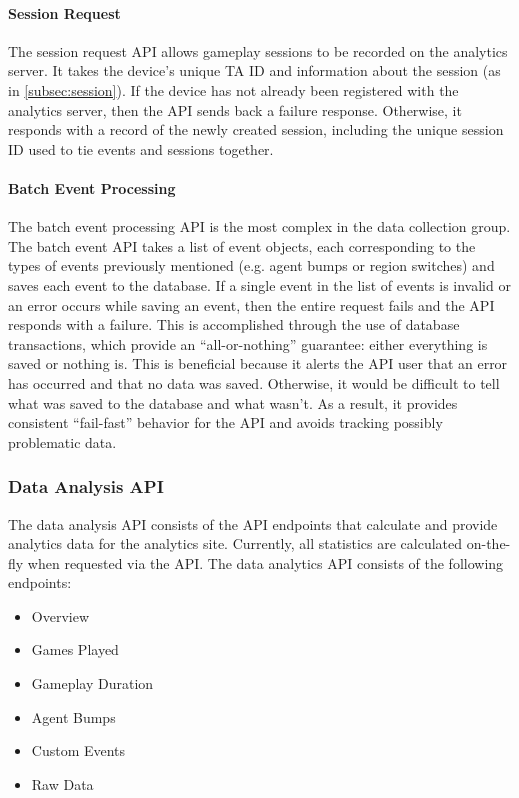\paragraph{Session Request}

The session request API allows gameplay sessions to be recorded on the analytics server. It takes the device's unique TA ID and information about the session (as in \ref{subsec:session}). If the device has not already been registered with the analytics server, then the API sends back a failure response. Otherwise, it responds with a record of the newly created session, including the unique session ID used to tie events and sessions together.

\paragraph{Batch Event Processing}

The batch event processing API is the most complex in the data collection group. The batch event API takes a list of event objects, each corresponding to the types of events previously mentioned (e.g. agent bumps or region switches) and saves each event to the database. If a single event in the list of events is invalid or an error occurs while saving an event, then the entire request fails and the API responds with a failure. This is accomplished through the use of database transactions, which provide an ``all-or-nothing'' guarantee: either everything is saved or nothing is. This is beneficial because it alerts the API user that an error has occurred and that no data was saved. Otherwise, it would be difficult to tell what was saved to the database and what wasn't. As a result, it provides consistent ``fail-fast'' behavior for the API and avoids tracking possibly problematic data.

\subsubsection{Data Analysis API}

The data analysis API consists of the API endpoints that calculate and provide analytics data for the analytics site. Currently, all statistics are calculated on-the-fly when requested via the API. The data analytics API consists of the following endpoints:
	\begin{itemize}
		\item Overview
		\item Games Played
		\item Gameplay Duration
		\item Agent Bumps
		\item Custom Events
		\item Raw Data
	\end{itemize}

